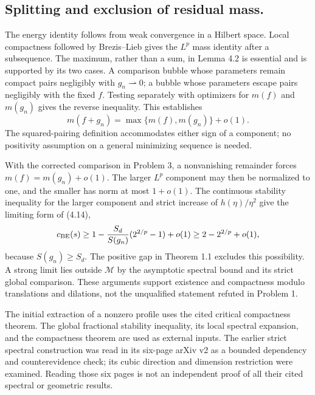 \documentclass[10pt]{article}
\begin{document}
\subsection*{Splitting and exclusion of residual mass.}
The energy identity follows from weak convergence in a Hilbert space. Local compactness followed by Brezis–Lieb gives the \(L^p\) mass identity after a subsequence. The maximum, rather than a sum, in Lemma 4.2 is essential and is supported by its two cases. A comparison bubble whose parameters remain compact pairs negligibly with \(g_n\rightharpoonup0\); a bubble whose parameters escape pairs negligibly with the fixed \(f\). Testing separately with optimizers for \(m(f)\) and \(m(g_n)\) gives the reverse inequality. This establishes \[m(f+g_n)=\max\{m(f),m(g_n)\}+o(1).\] The squared-pairing definition accommodates either sign of a component; no positivity assumption on a general minimizing sequence is needed.\par
With the corrected comparison in Problem 3, a nonvanishing remainder forces \(m(f)=m(g_n)+o(1)\). The larger \(L^p\) component may then be normalized to one, and the smaller has norm at most \(1+o(1)\). The continuous stability inequality for the larger component and strict increase of \(h(\eta)/\eta^2\) give the limiting form of (4.14), \[c_{\rm BE}(s)\ge
 1-\frac{S_d}{S(g_n)}(2^{2/p}-1)+o(1)
 \ge 2-2^{2/p}+o(1),\] because \(S(g_n)\ge S_d\). The positive gap in Theorem 1.1 excludes this possibility. A strong limit lies outside \(\mathcal M\) by the asymptotic spectral bound and its strict global comparison. These arguments support existence and compactness modulo translations and dilations, not the unqualified statement refuted in Problem 1.\par
The initial extraction of a nonzero profile uses the cited critical compactness theorem. The global fractional stability inequality, its local spectral expansion, and the compactness theorem are used as external inputs. The earlier strict spectral construction was read in its six-page arXiv v2 as a bounded dependency and counterevidence check; its cubic direction and dimension restriction were examined. Reading those six pages is not an independent proof of all their cited spectral or geometric results.\par
\end{document}
